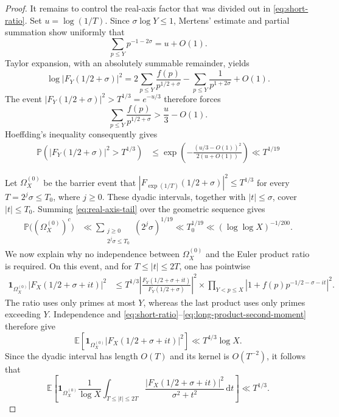 \documentclass[a4paper,12pt,reqno]{amsart}
\numberwithin{equation}{section}
\theoremstyle{remark}
\newcommand{\E}{\mathbb{E}}
\newcommand{\p}{\mathbb{P}}
\begin{document}
\begin{proof}
It remains to control the real-axis factor that was divided out in
\eqref{eq:short-ratio}.  Set $u=\log(1/T)$.  Since
$\sigma\log Y\leq1$, Mertens' estimate and partial summation show uniformly
that
\begin{equation}\label{eq:variance-real-axis}
 \sum_{p\leq Y}p^{-1-2\sigma}=u+O(1).
\end{equation}
Taylor expansion, with an absolutely summable remainder, yields
\begin{equation}\label{eq:real-axis-expansion}
 \log|F_Y(1/2+\sigma)|^2
 =2\sum_{p\leq Y}\frac{f(p)}{p^{1/2+\sigma}}
 -\sum_{p\leq Y}\frac1{p^{1+2\sigma}}+O(1).
\end{equation}
The event \(
 |F_Y(1/2+\sigma)|^2>T^{1/3}=e^{-u/3}
\)
therefore forces
\[
 \sum_{p\leq Y}\frac{f(p)}{p^{1/2+\sigma}}
 >\frac{u}{3}-O(1).
\]
Hoeffding's inequality consequently gives
 \begin{align}\label{eq:real-axis-tail}
 \p\left(|F_Y(1/2+\sigma)|^2>T^{1/3}\right)
 &\leq
 \exp\left(
 -\frac{(u/3-O(1))^2}{2(u+O(1))}
 \right)\ll T^{1/19}
 \end{align}

Let $\Omega_X^{(0)}$ be the barrier event that
$|F_{\exp(1/T)}(1/2+\sigma)|^2\leq T^{1/3}$ for every
$T=2^j\sigma\leq T_0$, where $j\geq0$. These dyadic intervals, together with
$|t|\leq\sigma$, cover $|t|\leq T_0$.  Summing
\eqref{eq:real-axis-tail} over the geometric sequence gives
\begin{equation}\label{eq:good-real-axis}
 \begin{aligned}
 \p\bigl((\Omega_X^{(0)})^c\bigr)
 &\ll
 \sum_{\substack{j\geq0\\2^j\sigma\leq T_0}}
 (2^j\sigma)^{1/19}\ll T_0^{1/19}
 \ll (\log\log X)^{-1/200}.
 \end{aligned}
\end{equation}
We now explain why no independence between $\Omega_X^{(0)}$ and the Euler
product ratio is required. On this event, and for $T\leq|t|\leq2T$, one has
pointwise
\begin{align*}
 \mathbf 1_{\Omega_X^{(0)}}|F_X(1/2+\sigma+it)|^2
 &\leq T^{1/3}
 \left|\frac{F_Y(1/2+\sigma+it)}
 {F_Y(1/2+\sigma)}\right|^2\times
 \prod_{Y<p\leq X}|1+f(p)p^{-1/2-\sigma-it}|^2 .
\end{align*}
The ratio uses only primes at most $Y$, whereas the last product uses only
primes exceeding $Y$.  Independence and
\eqref{eq:short-ratio}--\eqref{eq:long-product-second-moment} therefore give
\[
 \E\!\left[\mathbf 1_{\Omega_X^{(0)}}
 |F_X(1/2+\sigma+it)|^2\right]\ll T^{4/3}\log X.
\]
Since the dyadic interval has length $O(T)$ and its kernel is $O(T^{-2})$,
it follows
that
\[
 \E\left[\mathbf 1_{\Omega_X^{(0)}}\frac1{\log X}
 \int_{T\leq|t|\leq2T}
 \frac{|F_X(1/2+\sigma+it)|^2}{\sigma^2+t^2}\,\mathrm{d}t\right]
 \ll T^{1/3}.
\]


\end{proof}
\end{document}

